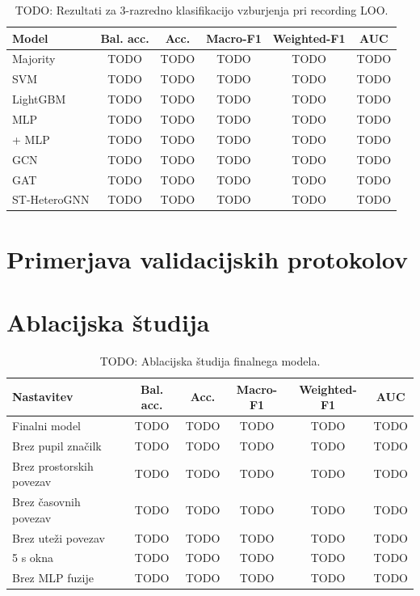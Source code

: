 \begin{table}[H]
    \centering
    \caption{TODO: Rezultati za 3-razredno klasifikacijo vzburjenja pri recording LOO.}
    \label{tab:results-arousal-recording-loo}
    \begin{tabular}{lccccc}
        \toprule
        Model & Bal. acc. & Acc. & Macro-F1 & Weighted-F1 & AUC \\
        \midrule
        Majority & TODO & TODO & TODO & TODO & TODO \\
        SVM & TODO & TODO & TODO & TODO & TODO \\
        LightGBM & TODO & TODO & TODO & TODO & TODO \\
        MLP & TODO & TODO & TODO & TODO & TODO \\
        \GazeMAE{} + MLP & TODO & TODO & TODO & TODO & TODO \\
        GCN & TODO & TODO & TODO & TODO & TODO \\
        GAT & TODO & TODO & TODO & TODO & TODO \\
        ST-HeteroGNN & TODO & TODO & TODO & TODO & TODO \\
        \bottomrule
    \end{tabular}
\end{table}

\section{Primerjava validacijskih protokolov}
\label{subsec:primerjava-splitov}


\section{Ablacijska študija}
\label{subsec:rezultati-ablation}

\begin{table}[H]
    \centering
    \caption{TODO: Ablacijska študija finalnega modela.}
    \label{tab:ablation}
    \begin{tabular}{lccccc}
        \toprule
        Nastavitev & Bal. acc. & Acc. & Macro-F1 & Weighted-F1 & AUC \\
        \midrule
        Finalni model & TODO & TODO & TODO & TODO & TODO \\
        Brez pupil značilk & TODO & TODO & TODO & TODO & TODO \\
        Brez prostorskih povezav & TODO & TODO & TODO & TODO & TODO \\
        Brez časovnih povezav & TODO & TODO & TODO & TODO & TODO \\
        Brez uteži povezav & TODO & TODO & TODO & TODO & TODO \\
        5 s okna & TODO & TODO & TODO & TODO & TODO \\
        Brez MLP fuzije & TODO & TODO & TODO & TODO & TODO \\
        \bottomrule
    \end{tabular}
\end{table}

